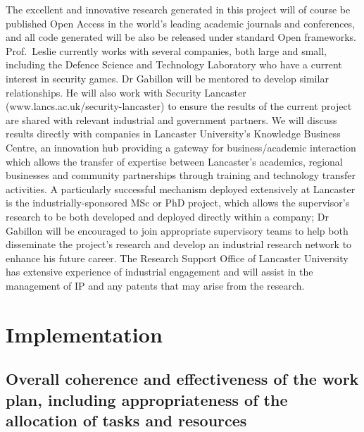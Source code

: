 \documentclass[a4paper,11pt]{article}
\newcommand{\TODO}[1]{{\textcolor{red}{[\textbf{TODO:} #1]}}}
\begin{document}
The excellent and innovative research generated in this project will of course be published Open Access in the world's leading academic journals and conferences, and all code generated will be also be released under standard Open frameworks.  Prof.\ Leslie currently works with several companies, both large and small, including the Defence Science and Technology Laboratory who have a current interest in security games. Dr Gabillon will be mentored to develop similar relationships.  He will also work with Security Lancaster (www.lancs.ac.uk/security-lancaster) to ensure the results of the current project are shared with relevant industrial and government partners.  We will discuss results directly with companies in Lancaster University's Knowledge Business Centre, an innovation hub providing a gateway for business/academic interaction which allows the transfer of expertise between Lancaster's academics, regional businesses and community partnerships through training and technology transfer activities.  A particularly successful mechanism deployed extensively at Lancaster is the industrially-sponsored MSc or PhD project, which allows the supervisor's research to be both developed and deployed directly within a company; Dr Gabillon will be encouraged to join appropriate supervisory teams to help both disseminate the project's research and develop an industrial research network to enhance his future career.  The Research Support Office of Lancaster University has extensive experience of industrial engagement and will assist in the management of IP and any patents that may arise from the research.

\section{Implementation}
\label{sec:implementation}


\subsection{Overall coherence and effectiveness of the work plan, including appropriateness of the allocation of tasks and resources}
\end{document}
